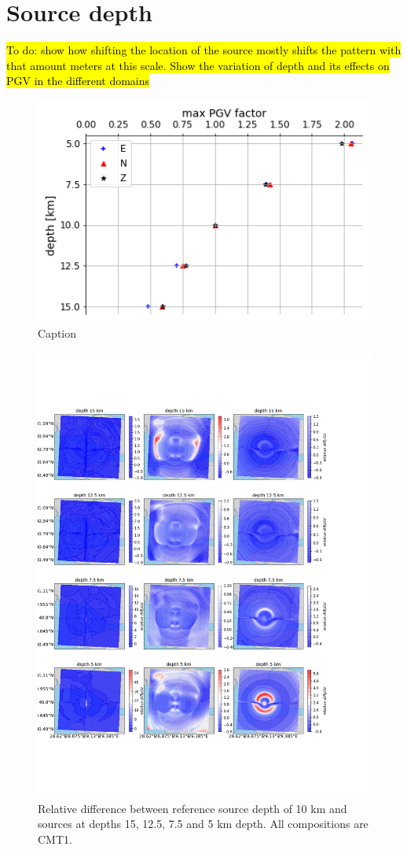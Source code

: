 \documentclass[../Text/00main.tex]{subfiles}
\begin{document}

\section{Source depth}

\hl{To do: show how shifting the location of the source mostly shifts the pattern with that amount meters at this scale. Show the variation of depth and its effects on PGV in the different domains}

\begin{figure}[ht!]
    \centering
    \includegraphics[width=.5\linewidth]{images_results/maxPGV_Depth.png}
    \caption{Caption}
    \label{fig:depth_maxpgv}
\end{figure}

\begin{figure}[h!]
    \centering
    \includegraphics[width=1.0\linewidth, trim= 0cm 4cm 2cm 4cm, clip]{images_results/Ref_scenarios_normalized_depth.png}
    \caption{Relative difference between reference source depth of 10 km and sources at depths 15, 12.5, 7.5 and 5 km depth. All compositions are CMT1.}
    \label{fig:depth_diff}
\end{figure}
\end{document}
